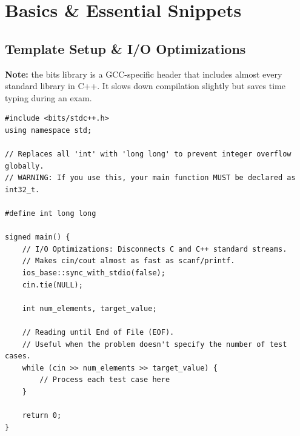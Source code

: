 \section{Basics \& Essential Snippets}

\subsection{Template Setup \& I/O Optimizations}
\textbf{Note:} the bits library is a GCC-specific header that includes almost every standard library in C++. It slows down compilation slightly but saves time typing during an exam.

\begin{lstlisting}
#include <bits/stdc++.h> 
using namespace std;

// Replaces all 'int' with 'long long' to prevent integer overflow globally.
// WARNING: If you use this, your main function MUST be declared as int32_t.

#define int long long

signed main() {
    // I/O Optimizations: Disconnects C and C++ standard streams.
    // Makes cin/cout almost as fast as scanf/printf.
    ios_base::sync_with_stdio(false);
    cin.tie(NULL);

    int num_elements, target_value;
    
    // Reading until End of File (EOF). 
    // Useful when the problem doesn't specify the number of test cases.
    while (cin >> num_elements >> target_value) {
        // Process each test case here
    }
    
    return 0;
}
\end{lstlisting}

